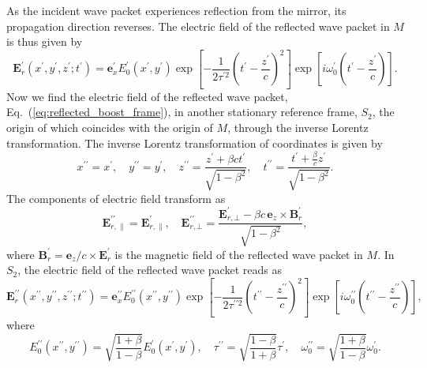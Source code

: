 \documentclass[10pt, a4paper, twoside, openright]{report}
\renewcommand{\vec}[1]{\mathbf{#1}}
\begin{document}
As the incident wave packet experiences reflection from the mirror, its propagation direction reverses. The electric field of the reflected wave packet in $ M $ is thus given by
\begin{equation}\label{eq:reflected_boost_frame}
\vec{E}^{\prime}_r \left(x^{\prime}, y^{\prime}, z^{\prime}; t^{\prime} \right) = \vec{e}_x^{\prime} E^{\prime}_0 \left(x^{\prime}, y^{\prime} \right) \exp \left[ - \frac{1}{2\tau^{\prime 2}} \left(t^{\prime} - \frac{z^{\prime}}{c}\right)^2 \right] \exp \left[ i \omega_0^{\prime} \left(t^{\prime} - \frac{z^{\prime}}{c}\right) \right].
\end{equation}
Now we find the electric field of the reflected wave packet, Eq.~(\ref{eq:reflected_boost_frame}), in another stationary reference frame, $ S_2 $, the origin of which coincides with the origin of $ M $, through the inverse Lorentz transformation. The inverse Lorentz transformation of coordinates is given by
\begin{equation}\label{eq:inverse_lorentz_transform_coords}
x^{\prime \prime} = x^{\prime}, \quad y^{\prime \prime} = y^{\prime}, \quad z^{\prime \prime} = \frac{z^{\prime} + \beta c t^{\prime}}{\sqrt{1 - \beta^2}}, \quad t^{\prime \prime} = \frac{t^{\prime} + \frac{\beta}{c} z^{\prime}}{\sqrt{1 - \beta^2}}.
\end{equation}
The components of electric field transform as
\begin{equation}\label{eq:inverse_lorentz_transform_fields}
	\vec{E}^{\prime \prime}_{r, \parallel} = \vec{E}^{\prime}_{r, \parallel}, \quad \vec{E}^{\prime \prime}_{r, \bot} = \frac{\vec{E}^{\prime}_{r, \bot} - \beta c \, \vec{e}_z \times \vec{B}^{\prime}_{r}}{\sqrt{1 - \beta^2}},
\end{equation}
where $ \vec{B}^{\prime}_{r} = \vec{e}_z / c \times \vec{E}^{\prime}_r $ is the magnetic field of the reflected wave packet in $ M $. In $ S_2 $, the electric field of the reflected wave packet reads as
\begin{equation}\label{eq:reflected_lab_frame_1}
\vec{E}^{\prime \prime}_r \left(x^{\prime \prime}, y^{\prime \prime}, z^{\prime \prime}; t^{\prime \prime} \right) = \vec{e}_x^{\prime \prime} E^{\prime \prime}_0 \left(x^{\prime \prime}, y^{\prime \prime} \right) \exp \left[ - \frac{1}{2 \tau^{\prime \prime 2}} \left(t^{\prime \prime} - \frac{z^{\prime \prime}}{c}\right)^2 \right] \exp \left[ i \omega_0^{\prime \prime} \left(t^{\prime \prime} - \frac{z^{\prime \prime}}{c}\right) \right],
\end{equation}
where
\begin{equation}\label{eq:coeff_lab}
E^{\prime \prime}_0 \left(x^{\prime \prime}, y^{\prime \prime} \right) = \sqrt{\frac{1 + \beta}{1 - \beta}} E^{\prime}_0 \left(x^{\prime}, y^{\prime} \right), \quad \tau^{\prime \prime} = \sqrt{\frac{1 - \beta}{1 + \beta}} \tau^{\prime}, \quad \omega_0^{\prime \prime} = \sqrt{\frac{1 + \beta}{1 - \beta}} \omega_0^{\prime}.
\end{equation}
\end{document}
